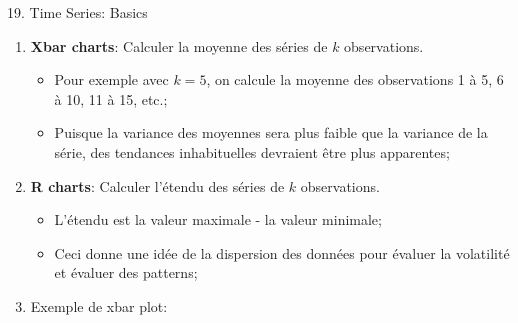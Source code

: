 \documentclass[12pt, titlepage, french]{report}
\begin{document}
\begin{CHPT_SUMM}{19. Time Series: Basics}
\begin{enumerate}
\begin{itemize}
\begin{itemize}
			\end{itemize}
		\end{itemize}
	\item[]	\textbf{Xbar charts}: Calculer la moyenne des séries de $k$ observations.
		\begin{itemize}
		\item	Pour exemple avec $k = 5$, on calcule la moyenne des observations 1 à 5, 6 à 10, 11 à 15, etc.;
		\item	Puisque la variance des moyennes sera plus faible que la variance de la série, des tendances inhabituelles devraient être plus apparentes;
		\end{itemize}
	\item[]	\textbf{R charts}: Calculer l'étendu des séries de $k$ observations.
		\begin{itemize}
		\item	L'étendu est la valeur maximale - la valeur minimale;
		\item	Ceci donne une idée de la dispersion des données pour évaluer la volatilité et évaluer des patterns;
		\end{itemize}
	\item[]	Exemple de xbar plot:
	

\end{enumerate}
\end{CHPT_SUMM}
\end{document}
